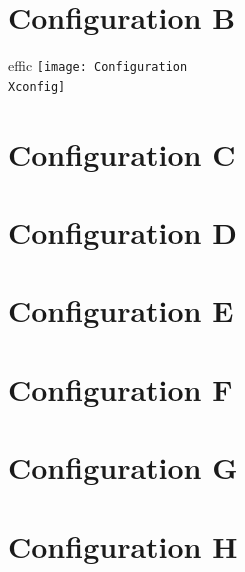 \documentclass[a4paper,twoside]{report}
\newcounter{N}
\newcounter{I}
\newcommand{\newconfig}[1]{%
\renewcommand{\Xconfig}{#1}
\chapter*{Configuration \Xconfig}

\newpage
\phantom{a}

\newpage
\phantom{a}

\newpage
\phantom{a}
}
\begin{document}
\newpage
\phantom{a}

\newpage
\phantom{a}

\newpage
\phantom{a}


\renewcommand{\Xconfig}{B}
\chapter*{Configuration \Xconfig}

\begin{dynamiccontents*}{effic}
\texttt{[image: Configuration\\Xconfig]}
\end{dynamiccontents*}

\newpage
\phantom{a}

\newpage
\phantom{a}

\newpage
\phantom{a}

\newconfig{C}

\newconfig{D}

\newconfig{E}

\newconfig{F}

\newconfig{G}

\newconfig{H}
\end{document}
